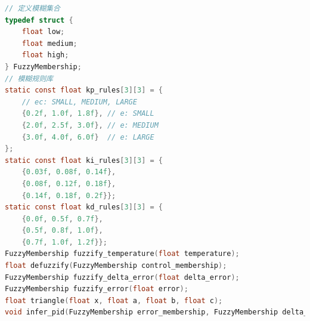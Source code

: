 \documentclass[UTF8]{ctexart}
\begin{document}
\begin{appendices}
\begin{lstlisting}[language=C, caption=TMF.h]
// 定义模糊集合
typedef struct {
	float low;
	float medium;
	float high;
} FuzzyMembership;
// 模糊规则库
static const float kp_rules[3][3] = {
	// ec: SMALL, MEDIUM, LARGE
	{0.2f, 1.0f, 1.8f}, // e: SMALL
	{2.0f, 2.5f, 3.0f}, // e: MEDIUM
	{3.0f, 4.0f, 6.0f}  // e: LARGE
};
static const float ki_rules[3][3] = {
	{0.03f, 0.08f, 0.14f},
	{0.08f, 0.12f, 0.18f},
	{0.14f, 0.18f, 0.2f}};
static const float kd_rules[3][3] = {
	{0.0f, 0.5f, 0.7f},
	{0.5f, 0.8f, 1.0f},
	{0.7f, 1.0f, 1.2f}};
FuzzyMembership fuzzify_temperature(float temperature);
float defuzzify(FuzzyMembership control_membership);
FuzzyMembership fuzzify_delta_error(float delta_error);
FuzzyMembership fuzzify_error(float error);
float triangle(float x, float a, float b, float c);
void infer_pid(FuzzyMembership error_membership, FuzzyMembership delta_error_membership, float *delta_kp, float *delta_ki, float *delta_kd);
\end{lstlisting}
\end{appendices}
\end{document}
